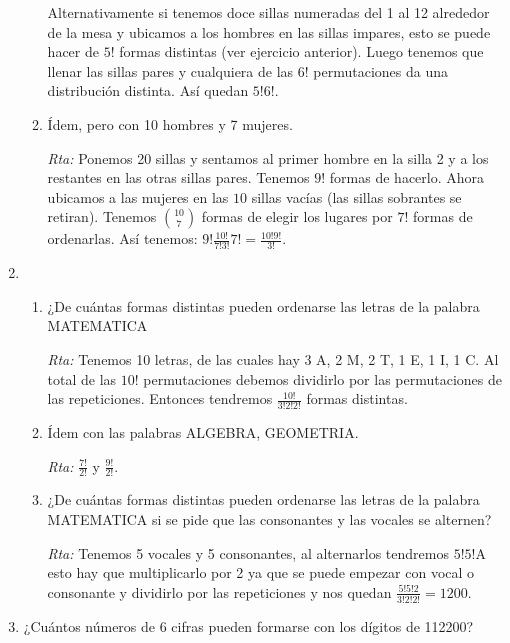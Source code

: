 \documentclass[a4paper,12pt,twoside,spanish,reqno]{amsbook}
\numberwithin{equation}{section}
\begin{document}
\begin{enumerate}
\begin{enumerate}
Alternativamente si tenemos doce sillas numeradas del 1 al 12 alrededor de la mesa y ubicamos a los hombres en las sillas impares, esto se puede hacer de $5!$ formas distintas (ver ejercicio anterior). Luego tenemos que llenar las sillas pares y cualquiera de las $6!$ permutaciones da una distribución distinta. Así quedan $5!6!$.

\item Ídem, pero con 10 hombres y 7 mujeres.

\noindent\textit{Rta:}  Ponemos 20 sillas y sentamos al primer  hombre en la silla 2 y  a los restantes en las otras sillas pares. Tenemos $9!$ formas de hacerlo. Ahora ubicamos a las mujeres en las $10$ sillas vacías (las sillas sobrantes se retiran). Tenemos $\binom{10}{7}$ formas de elegir los lugares por $7!$ formas de ordenarlas. Así tenemos: $\displaystyle 9! \frac{10!}{7!3!} 7!=\frac{10!9!}{3!}$.

\end{enumerate}

\medskip

\item 
\begin{enumerate}
\item 
 ¿De cuántas formas distintas pueden ordenarse las letras de la palabra MATEMATICA

\noindent\textit{Rta:} Tenemos 10 letras, de las cuales hay 3 A, 2 M, 2 T, 1 E, 1 I, 1 C. Al total de las $10!$ permutaciones debemos dividirlo por las permutaciones de las repeticiones. Entonces tendremos $\frac{10!}{3!2!2!}$ formas distintas.

\item Ídem con las palabras ALGEBRA, GEOMETRIA.

\noindent\textit{Rta:}  $\frac{7!}{2!}$ y $\frac{9!}{2!}$.

\item ¿De cuántas formas distintas pueden ordenarse las letras de la palabra MATEMATICA
si se pide que las consonantes y las vocales se alternen?

\noindent\textit{Rta:} Tenemos 5 vocales y 5 consonantes, al alternarlos tendremos $5!5!$A esto hay que multiplicarlo por 2 ya que se puede empezar con vocal o consonante y dividirlo por las repeticiones y nos quedan $\frac{5!5!2}{3!2!2!}=1200$.
\end{enumerate}

\medskip


\item¿Cuántos números de 6 cifras pueden formarse con los dígitos de 112200?


\end{enumerate}
\end{document}
